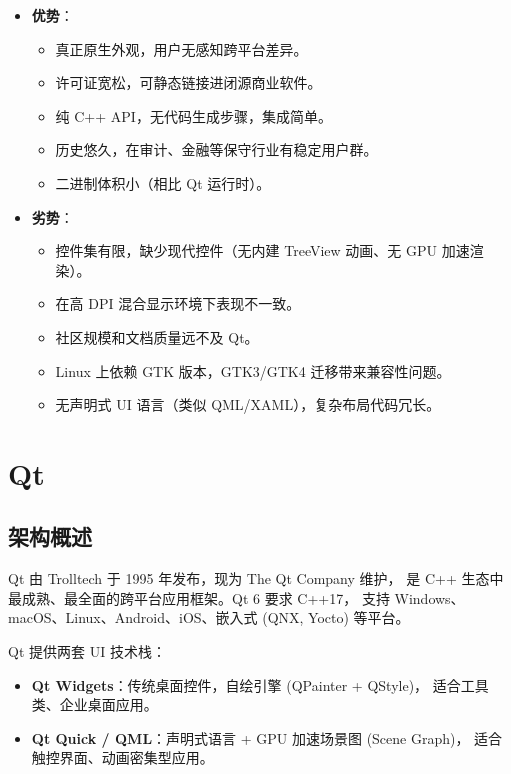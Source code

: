 \documentclass[12pt,a4paper,fontset=fandol]{ctexbook}
\begin{document}
\begin{compare}[title=wxWidgets 优劣分析]
\begin{itemize}
  \item \textbf{优势}：
    \begin{itemize}
      \item 真正原生外观，用户无感知跨平台差异。
      \item 许可证宽松，可静态链接进闭源商业软件。
      \item 纯 C++ API，无代码生成步骤，集成简单。
      \item 历史悠久，在审计、金融等保守行业有稳定用户群。
      \item 二进制体积小（相比 Qt 运行时）。
    \end{itemize}
  \item \textbf{劣势}：
    \begin{itemize}
      \item 控件集有限，缺少现代控件（无内建 TreeView 动画、无 GPU 加速渲染）。
      \item 在高 DPI 混合显示环境下表现不一致。
      \item 社区规模和文档质量远不及 Qt。
      \item Linux 上依赖 GTK 版本，GTK3/GTK4 迁移带来兼容性问题。
      \item 无声明式 UI 语言（类似 QML/XAML），复杂布局代码冗长。
    \end{itemize}
\end{itemize}
\end{compare}

\chapter{Qt}

\section{架构概述}

Qt 由 Trolltech 于 1995 年发布，现为 The Qt Company 维护，
是 C++ 生态中最成熟、最全面的跨平台应用框架。Qt 6 要求 C++17，
支持 Windows、macOS、Linux、Android、iOS、嵌入式 (QNX, Yocto) 等平台。

Qt 提供两套 UI 技术栈：

\begin{itemize}
  \item \textbf{Qt Widgets}：传统桌面控件，自绘引擎 (QPainter + QStyle)，
        适合工具类、企业桌面应用。
  \item \textbf{Qt Quick / QML}：声明式语言 + GPU 加速场景图 (Scene Graph)，
        适合触控界面、动画密集型应用。
\end{itemize}
\end{document}
